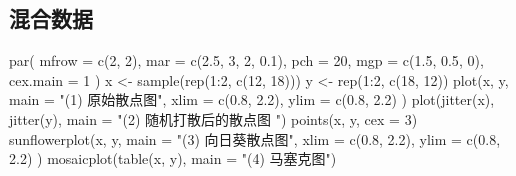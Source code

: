 \documentclass[
  b5paper,
  UTF8,twoside]{book}
\newenvironment{Shaded}{\begin{snugshade}}{\end{snugshade}}
\newcommand{\AttributeTok}[1]{\textcolor[rgb]{0.77,0.63,0.00}{#1}}
\newcommand{\DecValTok}[1]{\textcolor[rgb]{0.00,0.00,0.81}{#1}}
\newcommand{\FloatTok}[1]{\textcolor[rgb]{0.00,0.00,0.81}{#1}}
\newcommand{\FunctionTok}[1]{\textcolor[rgb]{0.00,0.00,0.00}{#1}}
\newcommand{\NormalTok}[1]{#1}
\newcommand{\OtherTok}[1]{\textcolor[rgb]{0.56,0.35,0.01}{#1}}
\newcommand{\SpecialCharTok}[1]{\textcolor[rgb]{0.00,0.00,0.00}{#1}}
\newcommand{\StringTok}[1]{\textcolor[rgb]{0.31,0.60,0.02}{#1}}
\begin{document}
\hypertarget{ux6df7ux5408ux6570ux636e}{%
\subsection{混合数据}\label{ux6df7ux5408ux6570ux636e}}

\begin{Shaded}
\begin{Highlighting}[]
\FunctionTok{par}\NormalTok{(}
  \AttributeTok{mfrow =} \FunctionTok{c}\NormalTok{(}\DecValTok{2}\NormalTok{, }\DecValTok{2}\NormalTok{), }\AttributeTok{mar =} \FunctionTok{c}\NormalTok{(}\FloatTok{2.5}\NormalTok{, }\DecValTok{3}\NormalTok{, }\DecValTok{2}\NormalTok{, }\FloatTok{0.1}\NormalTok{), }\AttributeTok{pch =} \DecValTok{20}\NormalTok{,}
  \AttributeTok{mgp =} \FunctionTok{c}\NormalTok{(}\FloatTok{1.5}\NormalTok{, }\FloatTok{0.5}\NormalTok{, }\DecValTok{0}\NormalTok{), }\AttributeTok{cex.main =} \DecValTok{1}
\NormalTok{)}
\NormalTok{x }\OtherTok{\textless{}{-}} \FunctionTok{sample}\NormalTok{(}\FunctionTok{rep}\NormalTok{(}\DecValTok{1}\SpecialCharTok{:}\DecValTok{2}\NormalTok{, }\FunctionTok{c}\NormalTok{(}\DecValTok{12}\NormalTok{, }\DecValTok{18}\NormalTok{)))}
\NormalTok{y }\OtherTok{\textless{}{-}} \FunctionTok{rep}\NormalTok{(}\DecValTok{1}\SpecialCharTok{:}\DecValTok{2}\NormalTok{, }\FunctionTok{c}\NormalTok{(}\DecValTok{18}\NormalTok{, }\DecValTok{12}\NormalTok{))}
\FunctionTok{plot}\NormalTok{(x, y,}
  \AttributeTok{main =} \StringTok{"(1) 原始散点图"}\NormalTok{, }\AttributeTok{xlim =} \FunctionTok{c}\NormalTok{(}\FloatTok{0.8}\NormalTok{, }\FloatTok{2.2}\NormalTok{),}
  \AttributeTok{ylim =} \FunctionTok{c}\NormalTok{(}\FloatTok{0.8}\NormalTok{, }\FloatTok{2.2}\NormalTok{)}
\NormalTok{)}
\FunctionTok{plot}\NormalTok{(}\FunctionTok{jitter}\NormalTok{(x), }\FunctionTok{jitter}\NormalTok{(y), }\AttributeTok{main =} \StringTok{"(2) 随机打散后的散点图 "}\NormalTok{)}
\FunctionTok{points}\NormalTok{(x, y, }\AttributeTok{cex =} \DecValTok{3}\NormalTok{)}
\FunctionTok{sunflowerplot}\NormalTok{(x, y,}
  \AttributeTok{main =} \StringTok{"(3) 向日葵散点图"}\NormalTok{,}
  \AttributeTok{xlim =} \FunctionTok{c}\NormalTok{(}\FloatTok{0.8}\NormalTok{, }\FloatTok{2.2}\NormalTok{), }\AttributeTok{ylim =} \FunctionTok{c}\NormalTok{(}\FloatTok{0.8}\NormalTok{, }\FloatTok{2.2}\NormalTok{)}
\NormalTok{)}
\FunctionTok{mosaicplot}\NormalTok{(}\FunctionTok{table}\NormalTok{(x, y), }\AttributeTok{main =} \StringTok{"(4) 马塞克图"}\NormalTok{)}
\end{Highlighting}
\end{Shaded}
\end{document}
